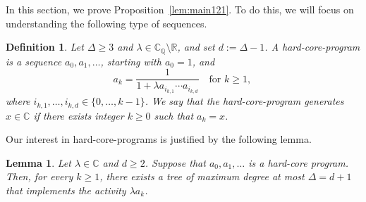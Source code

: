 \documentclass[11pt]{article}
\newtheorem{lemma}[theorem]{Lemma}
\newtheorem{definition}[theorem]{Definition}
\def\Reals{\mathbb{R}}
\def\Complex{\mathbb{C}}
\def\CQ{\mathbb{C}_{\mathbb{Q}}}
\begin{document}
In this section, we prove  Proposition~\ref{lem:main121}. To do this, we will focus on understanding the following type of sequences.
\begin{definition}\label{def:generates}
Let $\Delta\geq 3$ and $\lambda\in \CQ\setminus\Reals$, and set $d:=\Delta-1$. A hard-core-program is a sequence $a_0, a_1,\hdots$, starting with $a_0=1$,  and
\begin{equation}\label{eq:4f4m7ujf43f}
a_{k} = \frac{1}{1+\lambda a_{i_{k,1}}\cdots a_{i_{k,d}}}\quad\mbox{for $k\geq1$, }
\end{equation} where $i_{k,1},\dots,i_{k,d}\in\{0,\dots,k-1\}$. We say that the hard-core-program generates $x\in \Complex$ if there exists integer $k\geq 0$ such that $a_k=x$.
\end{definition}
Our interest in hard-core-programs is justified by the following lemma.
\begin{lemma}\label{lem:hard-core-imp}
Let $\lambda\in \Complex$ and $d\geq 2$. Suppose that $a_0,a_1,\hdots$ is a hard-core program. Then, for every $k\geq 1$, there exists a tree of maximum degree at most $\Delta=d+1$ that implements the activity $\lambda a_k$.
\end{lemma}
\end{document}
